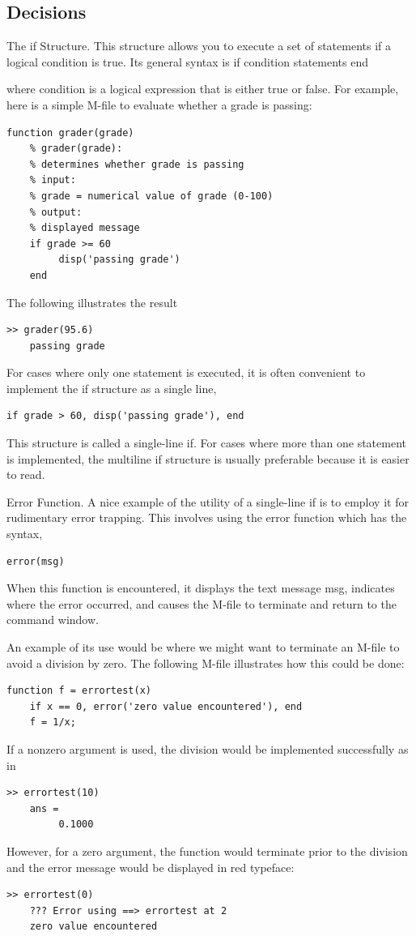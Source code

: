 \documentclass[../main.tex]{subfiles}
\begin{document}
\subsection{Decisions}

The if Structure. This structure allows you to execute a set of statements if a logical
condition is true. Its general syntax is
if condition
statements
end

where condition is a logical expression that is either true or false. For example, here is a
simple M-file to evaluate whether a grade is passing:
\begin{lstlisting}[frame=none, numbers=none]
    function grader(grade)
    % grader(grade):
    % determines whether grade is passing
    % input:
    % grade = numerical value of grade (0-100)
    % output:
    % displayed message
    if grade >= 60
         disp('passing grade')
    end
\end{lstlisting}
The following illustrates the result
\begin{lstlisting}[frame=none, numbers=none]
    >> grader(95.6)
    passing grade
\end{lstlisting}
For cases where only one statement is executed, it is often convenient to implement
the if structure as a single line,
\begin{lstlisting}[frame=none, numbers=none]
    if grade > 60, disp('passing grade'), end
\end{lstlisting}
This structure is called a single-line if. For cases where more than one statement is
implemented, the multiline if structure is usually preferable because it is easier to
read.

Error Function. A nice example of the utility of a single-line if is to employ it for rudimentary error trapping. This involves using the error function which has the syntax,
\begin{lstlisting}[frame=none, numbers=none]
    error(msg)
\end{lstlisting}
When this function is encountered, it displays the text message msg, indicates where
the error occurred, and causes the M-file to terminate and return to the command
window.


An example of its use would be where we might want to terminate an M-file to avoid
a division by zero. The following M-file illustrates how this could be done:
\begin{lstlisting}[frame=none, numbers=none]
    function f = errortest(x)
    if x == 0, error('zero value encountered'), end
    f = 1/x;
\end{lstlisting}
If a nonzero argument is used, the division would be implemented successfully as in
\begin{lstlisting}[frame=none, numbers=none]
    >> errortest(10)
    ans =
         0.1000
\end{lstlisting}
However, for a zero argument, the function would terminate prior to the division and the
error message would be displayed in red typeface:
\begin{lstlisting}[frame=none, numbers=none]
    >> errortest(0)
    ??? Error using ==> errortest at 2
    zero value encountered
\end{lstlisting}
\end{document}
